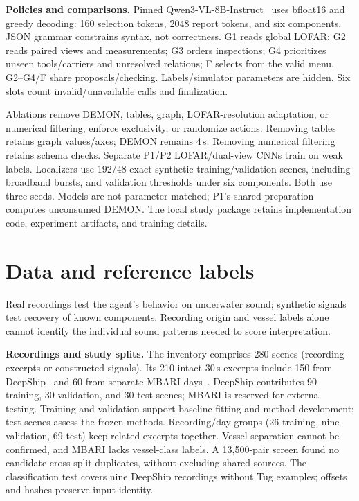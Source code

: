 \documentclass[runningheads,orivec]{llncs}
\begin{document}
\textbf{Policies and comparisons.}\label{sec:controllers}
Pinned Qwen3-VL-8B-Instruct~\cite{qwen3vl} uses bfloat16 and greedy decoding: 160 selection tokens, 2048 report tokens, and six components. JSON grammar constrains syntax, not correctness. G1 reads global LOFAR; G2 reads paired views and measurements; G3 orders inspections; G4 prioritizes unseen tools/carriers and unresolved relations; F selects from the valid menu. G2--G4/F share proposals/checking. Labels/simulator parameters are hidden. Six slots count invalid/unavailable calls and finalization.

Ablations remove DEMON, tables, graph, LOFAR-resolution adaptation, or numerical filtering, enforce exclusivity, or randomize actions. Removing tables retains graph values/axes; DEMON remains 4\,s. Removing numerical filtering retains schema checks. Separate P1/P2 LOFAR/dual-view CNNs train on weak labels. Localizers use 192/48 exact synthetic training/validation scenes, including broadband bursts, and validation thresholds under six components. Both use three seeds. Models are not parameter-matched; P1's shared preparation computes unconsumed DEMON. The local study package retains implementation code, experiment artifacts, and training details.

\section{Data and reference labels}
Real recordings test the agent's behavior on underwater sound; synthetic signals test recovery of known components. Recording origin and vessel labels alone cannot identify the individual sound patterns needed to score interpretation.

\textbf{Recordings and study splits.}
The inventory comprises 280 scenes (recording excerpts or constructed signals). Its 210 intact 30\,s excerpts include 150 from DeepShip~\cite{deepshipdata} and 60 from separate MBARI days~\cite{mbari}. DeepShip contributes 90 training, 30 validation, and 30 test scenes; MBARI is reserved for external testing. Training and validation support baseline fitting and method development; test scenes assess the frozen methods. Recording/day groups (26 training, nine validation, 69 test) keep related excerpts together. Vessel separation cannot be confirmed, and MBARI lacks vessel-class labels. A 13,500-pair screen found no candidate cross-split duplicates, without excluding shared sources. The classification test covers nine DeepShip recordings without Tug examples; offsets and hashes preserve input identity.
\end{document}
